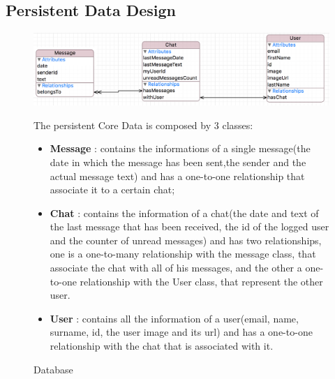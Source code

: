 \subsection{Persistent Data Design}
\begin{figure}[H]
\centering
\includegraphics[width=1\textwidth]{./images/Tinfinity_CoreData.png}
\caption{Database}


The persistent Core Data is composed by 3 classes:

\begin{itemize}
\item \textbf{Message} : contains the informations of a single message(the date in which the message has been sent,the sender and the actual message text) and has a one-to-one relationship that associate it to a certain chat;
\item \textbf{Chat} : contains the information of a chat(the date and text of the last message that has been received, the id of the logged user and the counter of unread messages) and has two relationships, one is a one-to-many relationship with the message class, that associate the chat with all of his messages, and the other a one-to-one relationship with the User class, that represent the other user.
\item \textbf{User} : contains all the information of a user(email, name, surname, id, the user image and its url) and has a one-to-one relationship with the chat that is associated with it.
\end{itemize}
\end{figure}







